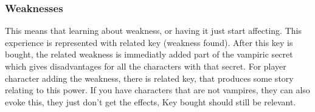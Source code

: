 \subsubsection{Weaknesses}
This means that learning about weakness, or having it just start affecting.
This experience is represented with related key (weakness found).
After this key is bought, the related weakness is immediatly added part of the vampiric secret which gives disadvantages for all the characters with that secret.
For player character adding the weakness, there is related key, that produces some story relating to this power.
If you have characters that are not vampires, they can also evoke this, they just don't get the effects,
	Key bought should still be relevant.

\pagebreak

